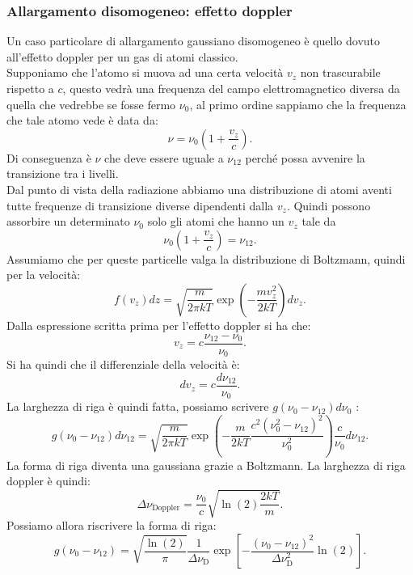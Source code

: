 \subsubsection{Allargamento disomogeneo: effetto doppler}%
Un caso particolare di allargamento gaussiano disomogeneo è quello dovuto all'effetto doppler per un gas di atomi classico.\\
Supponiamo che l'atomo si muova ad una certa velocità $v_z$  non trascurabile rispetto a $c$, questo vedrà una frequenza del campo elettromagnetico diversa da quella che vedrebbe se fosse fermo $\nu_0$, al primo ordine sappiamo che la frequenza che tale atomo vede è data da:
\[
    \nu  = \nu_0\left(1+\frac{v_z}{c}\right)
.\] 
Di conseguenza è $\nu$ che deve essere uguale a $\nu_{12}$  perché possa avvenire la transizione tra i livelli.\\
Dal punto di vista della radiazione abbiamo una distribuzione di atomi aventi tutte frequenze di transizione diverse dipendenti dalla $v_z$. Quindi possono assorbire un determinato $\nu_0 $ solo gli atomi che hanno un $v_z$  tale da
\[
    \nu_0\left(1+\frac{v_z}{c}\right) = \nu_{12}
.\] 
Assumiamo che per queste particelle valga la distribuzione di Boltzmann, quindi per la velocità:
\[
    f(v_z) dz = 
    \sqrt{\frac{m}{2\pi kT}} \exp\left(- \frac{mv_z^2}{2kT}\right)dv_z
.\] 
Dalla espressione scritta prima per l'effetto doppler si ha che:
\[
    v_z = c \frac{\nu_{12}-\nu_0}{\nu_0}
.\] 
Si ha quindi che il differenziale della velocità è:
\[
    dv_z = c \frac{d\nu_{12}}{\nu_{0}}
.\] 
La larghezza di riga è quindi fatta, possiamo scrivere $g(\nu_0-\nu_{12})d\nu_0$ :
\[
    g(\nu_0-\nu_{12}) d\nu_{12} = 
    \sqrt{\frac{m}{2\pi kT}}
    \exp\left(-\frac{m}{2kT}
    \frac{c^2\left(\nu_0^2-\nu_{12}\right)^2}{\nu_{0}^2}\right)
    \frac{c}{\nu_{0}}d\nu_{12}
.\] 
La forma di riga diventa una gaussiana grazie a Boltzmann. La larghezza di riga doppler è quindi:
\[
    \Delta\nu _\text{Doppler} = \frac{\nu_{0}}{c}\sqrt{\ln (2)  \frac{2kT}{m}}
.\] 
Possiamo allora riscrivere la forma di riga:
\[
    g(\nu_0-\nu_{12}) = \sqrt{\frac{\ln (2) }{\pi}}
    \frac{1}{\Delta\nu_\text{D} }
    \exp\left[- 
    \frac{\left(\nu_0-\nu_{12}\right)^2}{\Delta\nu_\text{D} ^2}\ln (2)
    \right]
.\]
